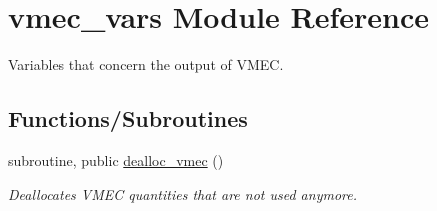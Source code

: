 \hypertarget{namespacevmec__vars}{}\section{vmec\+\_\+vars Module Reference}
\label{namespacevmec__vars}


Variables that concern the output of V\+M\+EC.  


\subsection*{Functions/\+Subroutines}
\begin{DoxyCompactItemize}
\item 
subroutine, public \hyperlink{namespacevmec__vars_afe14ec328664d93b93c6dbda69df9175}{dealloc\+\_\+vmec} ()
\begin{DoxyCompactList}\small\item\em Deallocates V\+M\+EC quantities that are not used anymore. \end{DoxyCompactList}\end{DoxyCompactItemize}
